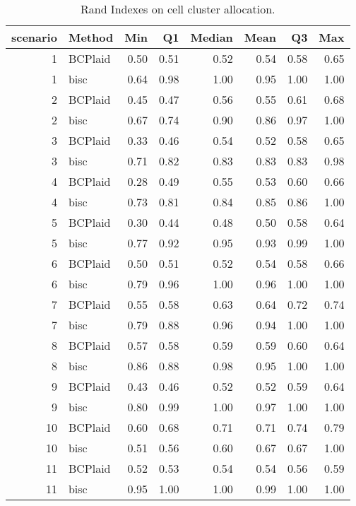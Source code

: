\begin{table}[ht]
\caption{Rand Indexes on cell cluster allocation.}
\vspace{1.5cm}
\centering
\begin{tabular}{rlrrrrrr}
  \toprule
scenario & Method & Min & Q1 & Median & Mean & Q3 & Max \\ 
  \midrule
  1 & BCPlaid & 0.50 & 0.51 & 0.52 & 0.54 & 0.58 & 0.65 \\ 
    1 & bisc & 0.64 & 0.98 & 1.00 & 0.95 & 1.00 & 1.00 \\ 
    2 & BCPlaid & 0.45 & 0.47 & 0.56 & 0.55 & 0.61 & 0.68 \\ 
    2 & bisc & 0.67 & 0.74 & 0.90 & 0.86 & 0.97 & 1.00 \\ 
    3 & BCPlaid & 0.33 & 0.46 & 0.54 & 0.52 & 0.58 & 0.65 \\ 
    3 & bisc & 0.71 & 0.82 & 0.83 & 0.83 & 0.83 & 0.98 \\ 
    4 & BCPlaid & 0.28 & 0.49 & 0.55 & 0.53 & 0.60 & 0.66 \\ 
    4 & bisc & 0.73 & 0.81 & 0.84 & 0.85 & 0.86 & 1.00 \\ 
    5 & BCPlaid & 0.30 & 0.44 & 0.48 & 0.50 & 0.58 & 0.64 \\ 
    5 & bisc & 0.77 & 0.92 & 0.95 & 0.93 & 0.99 & 1.00 \\ 
    6 & BCPlaid & 0.50 & 0.51 & 0.52 & 0.54 & 0.58 & 0.66 \\ 
    6 & bisc & 0.79 & 0.96 & 1.00 & 0.96 & 1.00 & 1.00 \\ 
    7 & BCPlaid & 0.55 & 0.58 & 0.63 & 0.64 & 0.72 & 0.74 \\ 
    7 & bisc & 0.79 & 0.88 & 0.96 & 0.94 & 1.00 & 1.00 \\ 
    8 & BCPlaid & 0.57 & 0.58 & 0.59 & 0.59 & 0.60 & 0.64 \\ 
    8 & bisc & 0.86 & 0.88 & 0.98 & 0.95 & 1.00 & 1.00 \\ 
    9 & BCPlaid & 0.43 & 0.46 & 0.52 & 0.52 & 0.59 & 0.64 \\ 
    9 & bisc & 0.80 & 0.99 & 1.00 & 0.97 & 1.00 & 1.00 \\ 
   10 & BCPlaid & 0.60 & 0.68 & 0.71 & 0.71 & 0.74 & 0.79 \\ 
   10 & bisc & 0.51 & 0.56 & 0.60 & 0.67 & 0.67 & 1.00 \\ 
   11 & BCPlaid & 0.52 & 0.53 & 0.54 & 0.54 & 0.56 & 0.59 \\ 
   11 & bisc & 0.95 & 1.00 & 1.00 & 0.99 & 1.00 & 1.00 \\ 

\end{tabular}
\end{table}
